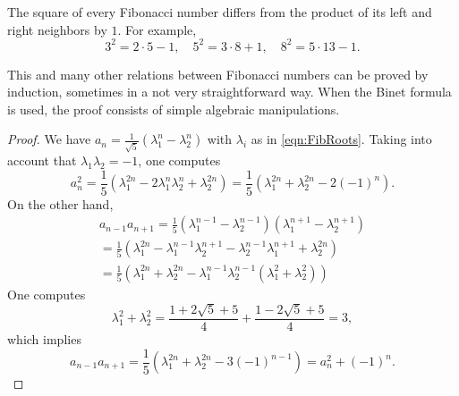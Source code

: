 \begin{page}

\begin{thm}
The square of every Fibonacci number differs from the product of its left and right neighbors by $1$.
For example,
\[
3^2 = 2 \cdot 5 - 1, \quad 5^2 = 3 \cdot 8 + 1, \quad 8^2 = 5 \cdot 13 - 1.
\]
\end{thm}

\end{page}

\begin{page}

This and many other relations between Fibonacci numbers can be proved by induction,
sometimes in a not very straightforward way.
When the Binet formula is used, the proof consists of simple algebraic manipulations.

\begin{proof}
We have $a_n = \frac{1}{\sqrt{5}}(\lambda_1^n - \lambda_2^n)$ with $\lambda_i$ as in \eqref{eqn:FibRoots}.
Taking into account that $\lambda_1\lambda_2 = -1$, one computes
\[
a_n^2 = \frac15(\lambda_1^{2n} - 2 \lambda_1^n \lambda_2^n + \lambda_2^{2n}) = \frac15(\lambda_1^{2n} + \lambda_2^{2n} - 2(-1)^n).
\]
On the other hand,
\begin{multline*}
a_{n-1} a_{n+1} = \frac15(\lambda_1^{n-1} - \lambda_2^{n-1})(\lambda_1^{n+1} - \lambda_2^{n+1})\\
= \frac15(\lambda_1^{2n} - \lambda_1^{n-1}\lambda_2^{n+1} - \lambda_2^{n-1}\lambda_1^{n+1} + \lambda_2^{2n})\\
= \frac15(\lambda_1^{2n} + \lambda_2^{2n} - \lambda_1^{n-1}\lambda_2^{n-1}(\lambda_1^2 + \lambda_2^2))
\end{multline*}
One computes
\[
\lambda_1^2 + \lambda_2^2 = \frac{1 + 2\sqrt{5} + 5}4 + \frac{1 - 2\sqrt{5} + 5}4 = 3,
\]
which implies
\[
a_{n-1} a_{n+1} = \frac15(\lambda_1^{2n} + \lambda_2^{2n} - 3(-1)^{n-1}) = a_n^2 + (-1)^n.
\]
\end{proof}





\end{page}

